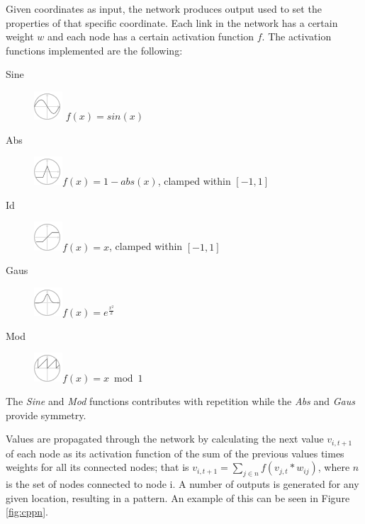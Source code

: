 Given coordinates as input, the network produces output used to set the properties of that specific coordinate. Each link in the network has a certain weight \(w\) and each node has a certain activation function \(f\). 
The activation functions implemented are the following:
\begin{description}
    \item[Sine] \includegraphics[align=c, width=30pt]{figure/activationFunctions/sine} \(f(x) = sin(x)\)
    \item[Abs] \includegraphics[align=c, width=30pt]{figure/activationFunctions/abs}\(f(x) = 1- abs(x)\), clamped within \([-1,1]\)
    \item[Id] \includegraphics[align=c, width=30pt]{figure/activationFunctions/id}\(f(x) = x\), clamped within \([-1,1]\)
    \item[Gaus] \includegraphics[align=c, width=30pt]{figure/activationFunctions/gaus}\(f(x) = e^{\frac{x^2}{2}}\)
    \item[Mod] \includegraphics[align=c, width=30pt]{figure/activationFunctions/mod}\(f(x) = x \bmod 1\)
\end{description}
The \emph{Sine} and \emph{Mod} functions contributes with repetition while the \emph{Abs} and \emph{Gaus} provide symmetry.

Values are propagated through the network by calculating the next value \(v_{i,t+1}\) of each node as its activation function of the sum of the previous values times weights for all its connected nodes; that is \(v_{i,t+1}=\sum_{j\in n}f(v_{j,t}*w_{ij})\), where \(n\) is the set of nodes connected to node i. A number of outputs is generated for any given location, resulting in a pattern. An example of this can be seen in Figure \ref{fig:cppn}.


